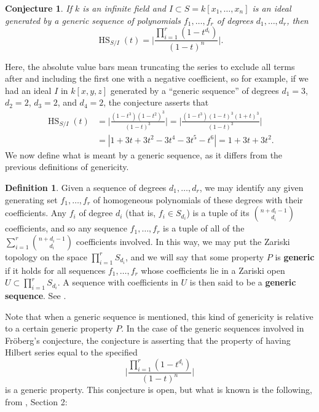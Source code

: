 \documentclass[11pt]{article}
\DeclareMathOperator{\HS}{HS}
\newtheorem{conjecture}{Conjecture}
\theoremstyle{definition}
\newtheorem{definition}{Definition}
\begin{document}
\begin{conjecture}\label{Fr}
	If $k$ is an infinite field and $I \subset S = k[x_1, \dots, x_n]$ is an ideal generated by a generic sequence of polynomials $f_1, \dots, f_r$ of degrees $d_1, \dots, d_r$, then \[ \HS_{S/I}(t) = \bigg| \frac{\prod_{i=1}^r (1 - t^{d_i})}{(1 - t)^n} \bigg|. \] 
\end{conjecture}


Here, the absolute value bars mean truncating the series to exclude all terms after and including the first one with a negative coefficient, so for example, if we had an ideal $I$ in $k[x,y,z]$ generated by a ``generic sequence'' of degrees $d_1 = 3$, $d_2 = 2$, $d_3 = 2$, and $d_4 = 2$, the conjecture asserts that \begin{align*}
	\HS_{S/I}(t) &= \bigg| \frac{(1 - t^3)(1 - t^2)^3}{(1 - t)^3} \bigg| = \bigg| \frac{(1 - t^3)(1 - t)^3(1 + t)^3}{(1 - t)^3} \bigg| \\
	&= |1 + 3t + 3t^2 - 3t^4 - 3t^5 - t^6| = 1 + 3t + 3t^2.
\end{align*} We now define what is meant by a generic sequence, as it differs from the previous definitions of genericity. 


\begin{definition}\label{def:genD}
	Given a sequence of degrees $d_1, \dots, d_r$, we may identify any given generating set $f_1, \dots, f_r$ of homogeneous polynomials of these degrees with their coefficients. Any $f_i$ of degree $d_i$ (that is, $f_i \in S_{d_i}$) is a tuple of its $\binom{n + d_i - 1}{d_i}$ coefficients, and so any sequence $f_1, \dots, f_r$ is a tuple of all of the $\sum_{i = 1}^r \binom{n + d_i - 1}{d_i}$ coefficients involved. In this way, we may put the Zariski topology on the space $\prod_{i = 1}^r S_{d_i}$, and we will say that some property $P$ is \textbf{generic} if it holds for all sequences $f_1, \dots, f_r$ whose coefficients lie in a Zariski open $U \subset \prod_{i = 1}^r S_{d_i}$. A sequence with coefficients in $U$ is then said to be a \textbf{generic sequence}. See \cite{pardue2010generic}.
\end{definition}


Note that when a generic sequence is mentioned, this kind of genericity is relative to a certain generic property $P$. In the case of the generic sequences involved in Fröberg's conjecture, the conjecture is asserting that the property of having Hilbert series equal to the specified \[ \bigg| \frac{\prod_{i=1}^r (1 - t^{d_i})}{(1 - t)^n} \bigg| \] is a generic property. This conjecture is open, but what is known is the following, from \cite{pardue2010generic}, Section 2:
\end{document}

